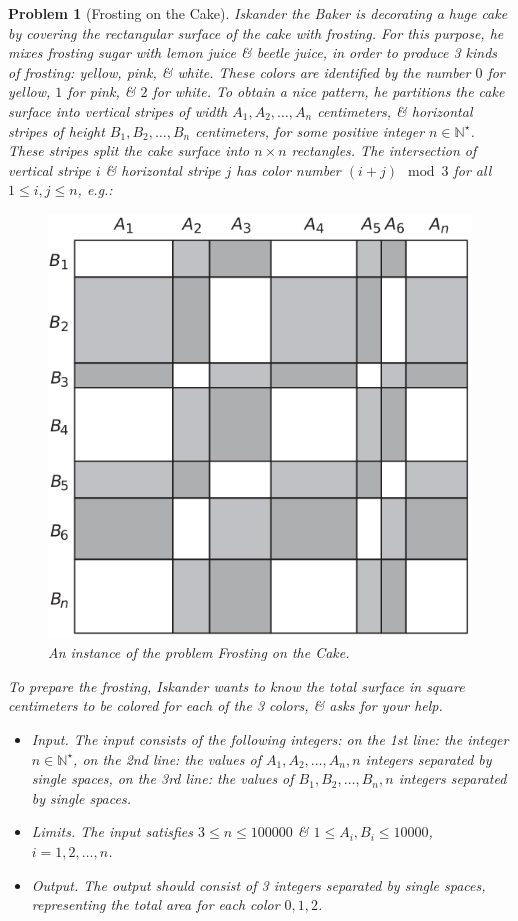 \documentclass{article}
\newtheorem{problem}{Problem}
\begin{document}
\begin{problem}[Frosting on the Cake]
	Iskander the Baker is decorating a huge cake by covering the rectangular surface of the cake with frosting. For this purpose, he mixes frosting sugar with lemon juice \& beetle juice, in order to produce 3 kinds of frosting: yellow, pink, \& white. These colors are identified by the number $0$ for yellow, $1$ for pink, \& $2$ for white. To obtain a nice pattern, he partitions the cake surface into vertical stripes of width $A_1,A_2,\ldots,A_n$ centimeters, \& horizontal stripes of height $B_1,B_2,\ldots,B_n$ centimeters, for some positive integer $n\in\mathbb{N}^\star$. These stripes split the cake surface into  $n\times n$ rectangles. The intersection of vertical stripe $i$ \& horizontal stripe $j$ has color number $(i + j)\mod3$ for all $1\le i,j\le n$, e.g.:
	\begin{figure}[H]
		\centering
		\includegraphics[scale=.25]{frosting_on_cake}
		\caption{An instance of the problem \textit{Frosting on the Cake}.}
	\end{figure}
	\noindent To prepare the frosting, Iskander wants to know the total surface in square centimeters to be colored for each of the 3 colors, \& asks for your help.
	\begin{itemize}
		\item {\sf Input.} The input consists of the following integers: on the 1st line: the integer $n\in\mathbb{N}^\star$, on the 2nd line: the values of $A_1,A_2,\ldots,A_n,n$ integers separated by single spaces, on the 3rd line: the values of $B_1,B_2,\ldots,B_n,n$ integers separated by single spaces.
		\item {\sf Limits.} The input satisfies $3\le n\le100000$ \& $1\le A_i,B_i\le10000$, $i = 1,2,\ldots,n$.
		\item {\sf Output.} The output should consist of 3 integers separated by single spaces, representing the total area for each color $0,1,2$.
	\end{itemize}
\end{problem}
\end{document}
